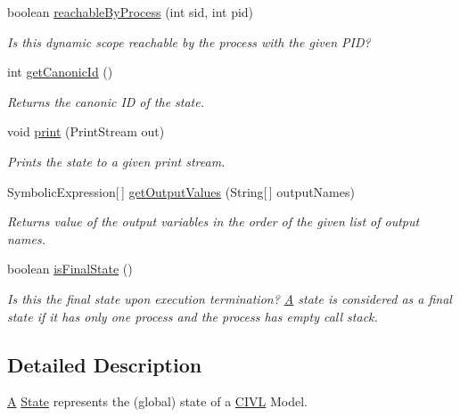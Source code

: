 \begin{DoxyCompactItemize}
boolean \hyperlink{interfaceedu_1_1udel_1_1cis_1_1vsl_1_1civl_1_1state_1_1IF_1_1State_a2f80f3b036393587fc1cf6ddc8f06d6c}{reachable\+By\+Process} (int sid, int pid)
\begin{DoxyCompactList}\small\item\em Is this dynamic scope reachable by the process with the given P\+I\+D? \end{DoxyCompactList}\item 
int \hyperlink{interfaceedu_1_1udel_1_1cis_1_1vsl_1_1civl_1_1state_1_1IF_1_1State_a89232165ee750dbe566cb20e76c579a4}{get\+Canonic\+Id} ()
\begin{DoxyCompactList}\small\item\em Returns the canonic I\+D of the state. \end{DoxyCompactList}\item 
void \hyperlink{interfaceedu_1_1udel_1_1cis_1_1vsl_1_1civl_1_1state_1_1IF_1_1State_a58c7a4c12e85f4443cf8456b91e06ef5}{print} (Print\+Stream out)
\begin{DoxyCompactList}\small\item\em Prints the state to a given print stream. \end{DoxyCompactList}\item 
Symbolic\+Expression\mbox{[}$\,$\mbox{]} \hyperlink{interfaceedu_1_1udel_1_1cis_1_1vsl_1_1civl_1_1state_1_1IF_1_1State_ade21b1fec0829a7282b04943af54ebdb}{get\+Output\+Values} (String\mbox{[}$\,$\mbox{]} output\+Names)
\begin{DoxyCompactList}\small\item\em Returns value of the output variables in the order of the given list of output names. \end{DoxyCompactList}\item 
boolean \hyperlink{interfaceedu_1_1udel_1_1cis_1_1vsl_1_1civl_1_1state_1_1IF_1_1State_a297e9429091944997c4059a8831312c7}{is\+Final\+State} ()
\begin{DoxyCompactList}\small\item\em Is this the final state upon execution termination? \hyperlink{structA}{A} state is considered as a final state if it has only one process and the process has empty call stack. \end{DoxyCompactList}\end{DoxyCompactItemize}


\subsection{Detailed Description}
\hyperlink{structA}{A} \hyperlink{interfaceedu_1_1udel_1_1cis_1_1vsl_1_1civl_1_1state_1_1IF_1_1State}{State} represents the (global) state of a \hyperlink{classedu_1_1udel_1_1cis_1_1vsl_1_1civl_1_1CIVL}{C\+I\+V\+L} Model. 

